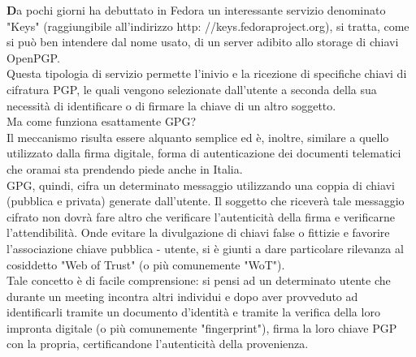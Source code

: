 \onehalfspacing
\lettrine[lines=1, loversize=0.1, lraise=0.1]{\color[cmyk]{0.5, 0, 1, 0}\bfseries D}{}a pochi giorni ha debuttato in Fedora un interessante servizio denominato "Keys" (raggiungibile all'indirizzo http: //keys.fedoraproject.org), si tratta, come si può ben intendere dal nome usato, di un server adibito allo storage di chiavi OpenPGP.\\

Questa tipologia di servizio permette l'inivio e la ricezione di specifiche chiavi di cifratura PGP, le quali vengono selezionate dall'utente a seconda della sua necessità di identificare o di firmare la chiave di un altro soggetto.\\

Ma come funziona esattamente GPG? \\

Il meccanismo risulta essere alquanto semplice ed è, inoltre, similare a quello utilizzato dalla firma digitale, forma di autenticazione dei documenti telematici che oramai sta prendendo piede anche in Italia.\\

GPG, quindi, cifra un determinato messaggio utilizzando una coppia di chiavi (pubblica e privata) generate dall'utente. Il soggetto che riceverà tale messaggio cifrato non dovrà fare altro che verificare l'autenticità della firma e verificarne l'attendibilità. Onde evitare la divulgazione di chiavi false o fittizie e favorire l'associazione chiave pubblica - u\-tente, si è giunti a dare particolare rilevanza al cosiddetto "Web of Trust" (o più comunemente "WoT").\\

Tale concetto è di facile comprensione: si pensi ad un determinato utente che durante un meeting incontra altri individui e dopo aver provveduto ad identificarli tramite un documento d'identità e tramite la verifica della loro impronta digitale (o più comunemente "fingerprint"), firma la loro chiave PGP con la propria, certificandone l'autenticità della provenienza.\\

